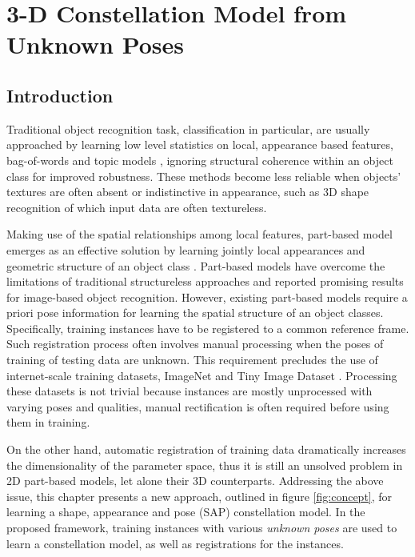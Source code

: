 \chapter{3-D Constellation Model from Unknown Poses}
\label{chap/3dreg}

\section{Introduction}
\label{sec:intro}

Traditional object recognition task, classification in particular, are usually approached by learning low level statistics on local, appearance based features, \eg bag-of-words \cite{Sivic2005, Fei-Fei2005} and topic models \cite{Fergus2005}, ignoring structural coherence within an object class for improved robustness. These methods become less reliable when objects' textures are often absent or indistinctive in appearance, such as 3D shape recognition of which input data are often textureless. 

Making use of the spatial relationships among local features, part-based model emerges as an effective solution by learning jointly local appearances and geometric structure of an object class \cite{Weber2000, Felzenszwalb2005, Fergus2007}. 
Part-based models have overcome the limitations of traditional structureless approaches and reported promising results for image-based object recognition. However, existing part-based models require a priori pose information for learning the spatial structure of an object classes. Specifically, training instances have to be registered to a common reference frame. Such registration process often involves manual processing when the poses of training of testing data are unknown. This requirement precludes the use of internet-scale training datasets, \eg ImageNet \cite{Deng2009} and Tiny Image Dataset \cite{Torralba2008}. Processing these datasets is not trivial because instances are mostly unprocessed with varying poses and qualities, manual rectification is often required before using them in training. 

On the other hand, automatic registration of training data dramatically increases the dimensionality of the parameter space, thus it is still an unsolved problem in 2D part-based models, let alone their 3D counterparts. Addressing the above issue, this chapter presents a new approach, outlined in figure \ref{fig:concept}, for learning a shape, appearance and pose (SAP) constellation model. In the proposed framework, training instances with various \emph{unknown poses} are used to learn a constellation model, as well as registrations for the instances.  

